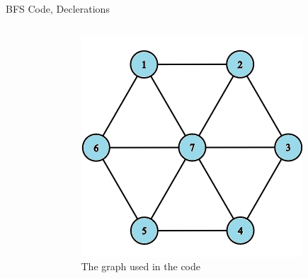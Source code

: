 \documentclass[aspectratio=169]{beamer}%
\begin{document}
\begin{frame}{BFS Code, Declerations}
    \begin{columns}
        \begin{column}{0.70\textwidth}
        \end{column}
        \hfill
        \begin{column}{0.25\textwidth}
            \begin{figure}[ht]
                \centering
                \includegraphics[width = .9\linewidth]{bfs 18.png}
                \caption{The graph used in the code}
            \end{figure}{}
        \end{column}
    \end{columns}    
\end{frame}
\end{document}
